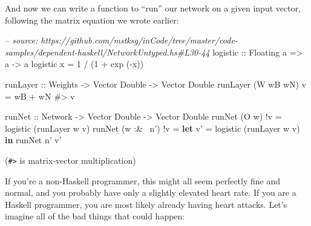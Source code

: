\documentclass[]{article}
\newenvironment{Shaded}{}{}
\newcommand{\KeywordTok}[1]{\textcolor[rgb]{0.00,0.44,0.13}{\textbf{{#1}}}}
\newcommand{\DataTypeTok}[1]{\textcolor[rgb]{0.56,0.13,0.00}{{#1}}}
\newcommand{\DecValTok}[1]{\textcolor[rgb]{0.25,0.63,0.44}{{#1}}}
\newcommand{\CommentTok}[1]{\textcolor[rgb]{0.38,0.63,0.69}{\textit{{#1}}}}
\newcommand{\OtherTok}[1]{\textcolor[rgb]{0.00,0.44,0.13}{{#1}}}
\newcommand{\FunctionTok}[1]{\textcolor[rgb]{0.02,0.16,0.49}{{#1}}}
\newcommand{\NormalTok}[1]{{#1}}
\begin{document}
And now we can write a function to ``run'' our network on a given input vector,
following the matrix equation we wrote earlier:

\begin{Shaded}
\begin{Highlighting}[]
\CommentTok{-- source: https://github.com/mstksg/inCode/tree/master/code-samples/dependent-haskell/NetworkUntyped.hs#L30-44}
\OtherTok{logistic ::} \DataTypeTok{Floating} \NormalTok{a }\OtherTok{=>} \NormalTok{a }\OtherTok{->} \NormalTok{a}
\NormalTok{logistic x }\FunctionTok{=} \DecValTok{1} \FunctionTok{/} \NormalTok{(}\DecValTok{1} \FunctionTok{+} \NormalTok{exp (}\FunctionTok{-}\NormalTok{x))}

\OtherTok{runLayer ::} \DataTypeTok{Weights} \OtherTok{->} \DataTypeTok{Vector} \DataTypeTok{Double} \OtherTok{->} \DataTypeTok{Vector} \DataTypeTok{Double}
\NormalTok{runLayer (}\DataTypeTok{W} \NormalTok{wB wN) v }\FunctionTok{=} \NormalTok{wB }\FunctionTok{+} \NormalTok{wN }\FunctionTok{#>} \NormalTok{v}

\OtherTok{runNet ::} \DataTypeTok{Network} \OtherTok{->} \DataTypeTok{Vector} \DataTypeTok{Double} \OtherTok{->} \DataTypeTok{Vector} \DataTypeTok{Double}
\NormalTok{runNet (}\DataTypeTok{O} \NormalTok{w)      }\FunctionTok{!}\NormalTok{v }\FunctionTok{=} \NormalTok{logistic (runLayer w v)}
\NormalTok{runNet (w }\FunctionTok{:&~} \NormalTok{n') }\FunctionTok{!}\NormalTok{v }\FunctionTok{=} \KeywordTok{let} \NormalTok{v' }\FunctionTok{=} \NormalTok{logistic (runLayer w v)}
                       \KeywordTok{in}  \NormalTok{runNet n' v'}
\end{Highlighting}
\end{Shaded}

(\texttt{\#\textgreater{}} is matrix-vector multiplication)

If you're a non-Haskell programmer, this might all seem perfectly fine and
normal, and you probably have only a slightly elevated heart rate. If you are a
Haskell programmer, you are most likely already having heart attacks. Let's
imagine all of the bad things that could happen:
\end{document}
